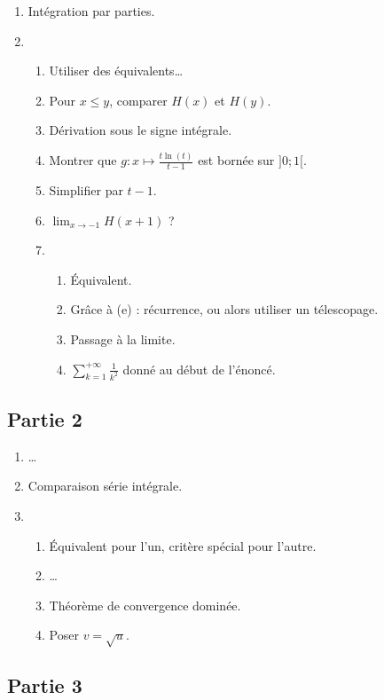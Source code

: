 \documentclass[twoside,french,10pt]{VcCours}
\begin{document}
\begin{enumerate}
\item Intégration par parties.
\item
\begin{enumerate}
	\item Utiliser des équivalents\ldots
	\item Pour $x\leq y$, comparer $H(x)$ et $H(y)$. 
	\item Dérivation sous le signe intégrale.
	\item Montrer que $g:x\longmapsto\frac{t\ln(t)}{t-1}$ est bornée sur $]0;1[$.
	\item Simplifier par $t-1$.
	\item $\lim_{x\to-1}H(x+1)$ ?
	\item 
\begin{enumerate}
		\item Équivalent.
		\item Grâce à (e) : récurrence, ou alors utiliser un télescopage.
		\item Passage à la limite.
		\item $\sum_{k=1}^{+\infty}\frac{1}{k^2}$ donné au début de l'énoncé.
\end{enumerate}
\end{enumerate}
\end{enumerate}

\subsection*{Partie 2}

\begin{enumerate}
\item \ldots 
\item Comparaison série intégrale.
\item 
\begin{enumerate}
	\item Équivalent pour l'un, critère spécial pour l'autre.
	\item \ldots
	\item Théorème de convergence dominée.
	\item Poser $v=\sqrt{u}$.
\end{enumerate}
\end{enumerate}

\subsection*{Partie 3}
\end{document}
